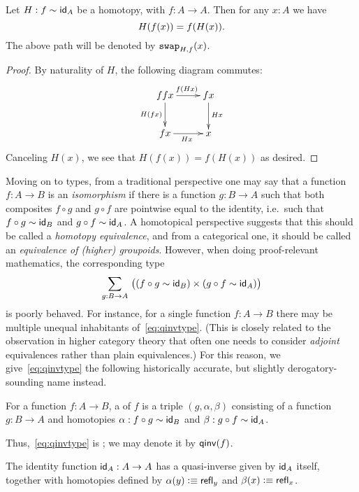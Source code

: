 \begin{cor}\label{cor:hom-fg}
Let $H : f \htpy \idfunc[A]$ be a homotopy, with $f : A \to A$. Then for any $x : A$ we have \[ H(f(x)) = \ap f{H(x)}. \] The above path will be denoted by $\com{H}{f}{x}$.
\end{cor}
\begin{proof}
By naturality of $H$, the following diagram commutes:
\begin{align*}
\xymatrix{
ffx \ar[r]^{\ap f{Hx}} \ar[d]_{H(fx)} & fx \ar[d]^{Hx} \\
fx \ar[r]_{Hx} & x
}
\end{align*}
Canceling $H(x)$, we see that $H(f(x)) = f(H(x))$ as desired.
\end{proof}

Moving on to types, from a traditional perspective one may say that a function $f:A\to B$ is an \emph{isomorphism} if there is a function $g:B\to A$ such that both composites $f\circ g$ and $g\circ f$ are pointwise equal to the identity, i.e.\ such that $f \circ g \htpy \idfunc[B]$ and $g\circ f \htpy \idfunc[A]$.
A homotopical perspective suggests that this should be called a \emph{homotopy equivalence}, and from a categorical one, it should be called an \emph{equivalence of (higher) groupoids}.
However, when doing proof-relevant mathematics, the corresponding type
\begin{equation}
  \sm{g:B\to A} \big((f \circ g \htpy \idfunc[B]) \times (g\circ f \htpy \idfunc[A])\big)\label{eq:qinvtype}
\end{equation}
is poorly behaved.
For instance, for a single function $f:A\to B$ there may be multiple unequal inhabitants of~\eqref{eq:qinvtype}.
(This is closely related to the observation in higher category theory that often one needs to consider \emph{adjoint} equivalences rather than plain equivalences.)
For this reason, we give~\eqref{eq:qinvtype} the following historically accurate, but slightly derogatory-sounding name instead.

\begin{defn}
  For a function $f:A\to B$, a  of $f$ is a triple $(g,\alpha,\beta)$ consisting of a function $g:B\to A$ and homotopies
$\alpha:f\circ g\htpy \idfunc[B]$ and $\beta:g\circ f\htpy \idfunc[A]$.
\end{defn}

Thus,~\eqref{eq:qinvtype} is ; we may denote it by $\qinv(f)$.

\begin{eg}\label{eg:idequiv}
  The identity function $\idfunc[A]:A\to A$ has a quasi-inverse given by $\idfunc[A]$ itself, together with homotopies defined by $\alpha(y) \defeq \refl{y}$ and $\beta(x) \defeq \refl{x}$.
\end{eg}

